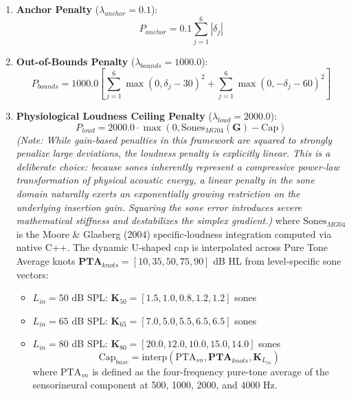 \documentclass[
  12pt,
]{article}
\providecommand{\tightlist}{%
  \setlength{\itemsep}{0pt}\setlength{\parskip}{0pt}}
\begin{document}
\begin{enumerate}
\def\labelenumi{\arabic{enumi}.}
\item
  \textbf{Anchor Penalty} (\(\lambda_{anchor} = 0.1\)): \begin{equation}
  P_{anchor} = 0.1 \sum_{j=1}^6 |\delta_j|
  \end{equation}
\item
  \textbf{Out-of-Bounds Penalty} (\(\lambda_{bounds} = 1000.0\)):
  \begin{equation}
  P_{bounds} = 1000.0 \left[\sum_{j=1}^6 \max(0, \delta_j - 30)^2 + \sum_{j=1}^6 \max(0, -\delta_j - 60)^2\right]
  \end{equation}
\item
  \textbf{Physiological Loudness Ceiling Penalty}
  (\(\lambda_{loud} = 2000.0\)): \begin{equation}
  P_{loud} = 2000.0 \cdot \max(0, \text{Sones}_{MG04}(\mathbf{G}) - \text{Cap})
  \end{equation} \emph{(Note: While gain-based penalties in this
  framework are squared to strongly penalize large deviations, the
  loudness penalty is explicitly linear. This is a deliberate choice:
  because sones inherently represent a compressive power-law
  transformation of physical acoustic energy, a linear penalty in the
  sone domain naturally exerts an exponentially growing restriction on
  the underlying insertion gain. Squaring the sone error introduces
  severe mathematical stiffness and destabilizes the simplex gradient.)}
  where \(\text{Sones}_{MG04}\) is the Moore \& Glasberg (2004)
  specific-loudness integration computed via native C++. The dynamic
  U-shaped cap is interpolated across Pure Tone Average knots
  \(\mathbf{PTA}_{knots} = [10, 35, 50, 75, 90]\) dB HL from
  level-specific sone vectors:

  \begin{itemize}
  \tightlist
  \item
    \(L_{in} = 50\) dB SPL:
    \(\mathbf{K}_{50} = [1.5, 1.0, 0.8, 1.2, 1.2]\) sones
  \item
    \(L_{in} = 65\) dB SPL:
    \(\mathbf{K}_{65} = [7.0, 5.0, 5.5, 6.5, 6.5]\) sones
  \item
    \(L_{in} = 80\) dB SPL:
    \(\mathbf{K}_{80} = [20.0, 12.0, 10.0, 15.0, 14.0]\) sones
    \begin{equation}
    \text{Cap}_{base} = \text{interp}\left(\text{PTA}_{sn}, \mathbf{PTA}_{knots}, \mathbf{K}_{L_{in}}\right)
    \end{equation} where \(\text{PTA}_{sn}\) is defined as the
    four-frequency pure-tone average of the sensorineural component at
    500, 1000, 2000, and 4000 Hz.
  \end{itemize}


\end{enumerate}
\end{document}
